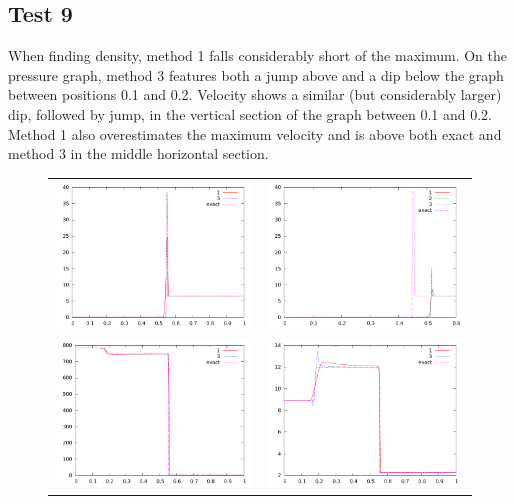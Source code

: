 \documentclass[letterpaper,12pt]{article}
\begin{document}
\clearpage

\subsection{Test 9}
When finding density, method 1 falls considerably short of the maximum. On the pressure graph, method 3 features both a jump above and a dip below the graph between positions 0.1 and 0.2. Velocity shows a similar (but considerably larger) dip, followed by jump, in the vertical section of the graph between 0.1 and 0.2. Method 1 also overestimates the maximum velocity and is above both exact and method 3 in the middle horizontal section. 

\begin{figure}[h]
  \begin{center}
	\begin{tabular}{cc}
      \includegraphics[width=.4\textwidth]{den_T9.png} &
	  \includegraphics[width=.4\textwidth]{denT9zoom.png} \\
	  \includegraphics[width=.4\textwidth]{prs_T9.png} &	
      \includegraphics[width=.4\textwidth]{vel_T9.png}\\
	\end{tabular}	
  \end{center}
  \caption{}
\end{figure}
\end{document}
